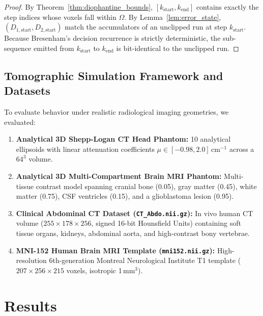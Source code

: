\documentclass[11pt]{article}
\begin{document}
\begin{proof}
By Theorem~\ref{thm:diophantine_bounds}, $[k_{\mathrm{start}}, k_{\mathrm{end}}]$ contains exactly the step indices whose voxels fall within $\Omega$. By Lemma~\ref{lem:error_state}, $(D_{1,\mathrm{start}}, D_{2,\mathrm{start}})$ match the accumulators of an unclipped run at step $k_{\mathrm{start}}$. Because Bresenham's decision recurrence is strictly deterministic, the sub-sequence emitted from $k_{\mathrm{start}}$ to $k_{\mathrm{end}}$ is bit-identical to the unclipped run.
\end{proof}

\subsection*{Tomographic Simulation Framework and Datasets}
To evaluate behavior under realistic radiological imaging geometries, we evaluated:
\begin{enumerate}
    \item \textbf{Analytical 3D Shepp-Logan CT Head Phantom:} 10 analytical ellipsoids with linear attenuation coefficients $\mu \in [-0.98, 2.0]$\,cm$^{-1}$ across a $64^3$ volume.
    \item \textbf{Analytical 3D Multi-Compartment Brain MRI Phantom:} Multi-tissue contrast model spanning cranial bone (0.05), gray matter (0.45), white matter (0.75), CSF ventricles (0.15), and a glioblastoma lesion (0.95).
    \item \textbf{Clinical Abdominal CT Dataset (\texttt{CT\_Abdo.nii.gz}):} In vivo human CT volume ($255 \times 178 \times 256$, signed 16-bit Hounsfield Units) containing soft tissue organs, kidneys, abdominal aorta, and high-contrast bony vertebrae.
    \item \textbf{MNI-152 Human Brain MRI Template (\texttt{mni152.nii.gz}):} High-resolution 6th-generation Montreal Neurological Institute T1 template ($207 \times 256 \times 215$ voxels, isotropic 1\,mm$^3$).
\end{enumerate}

\section*{Results}
\label{sec:results}
\end{document}
